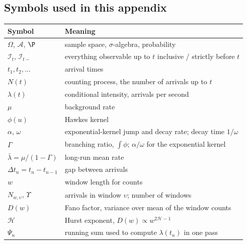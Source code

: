 \subsection{Symbols used in this appendix}

\begin{center}\small
\begin{tabular}{@{}ll@{}}
\toprule
Symbol & Meaning \\
\midrule
$\Omega$, $\mathcal{A}$, $\P$ & sample space, $\sigma$-algebra, probability \\
$\mathcal{I}_t$, $\mathcal{I}_{t-}$ & everything observable up to $t$ inclusive / strictly before $t$ \\
$t_1, t_2, \ldots$ & arrival times \\
$N(t)$ & counting process, the number of arrivals up to $t$ \\
$\lambda(t)$ & conditional intensity, arrivals per second \\
$\mu$ & background rate \\
$\phi(u)$ & Hawkes kernel \\
$\alpha$, $\omega$ & exponential-kernel jump and decay rate; decay time $1/\omega$ \\
$\Gamma$ & branching ratio, $\int\phi$; $\alpha/\omega$ for the exponential kernel \\
$\bar\lambda = \mu/(1-\Gamma)$ & long-run mean rate \\
$\Delta t_n = t_n - t_{n-1}$ & gap between arrivals \\
$w$ & window length for counts \\
$N_{w,\upsilon}$, $\Upsilon$ & arrivals in window $\upsilon$; number of windows \\
$D(w)$ & Fano factor, variance over mean of the window counts \\
$\mathcal{H}$ & Hurst exponent, $D(w) \propto w^{2\mathcal{H}-1}$ \\
$\Psi_n$ & running sum used to compute $\lambda(t_n)$ in one pass \\
\bottomrule
\end{tabular}
\end{center}
